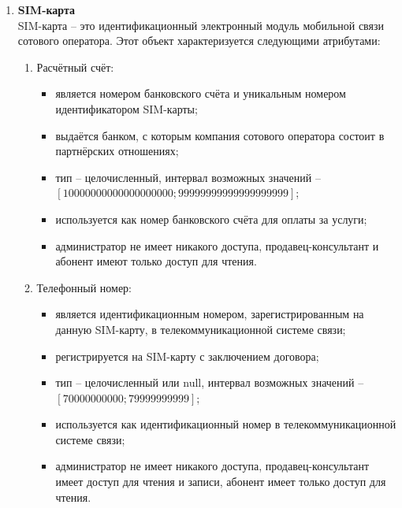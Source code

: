 \begin{enumerate}
    \item \textbf{SIM-карта} \\
    SIM-карта -- это идентификационный электронный модуль мобильной связи сотового оператора. Этот объект характеризуется следующими атрибутами:
    \begin{enumerate}
        \item Расчётный счёт:
        \begin{itemize}
            \item является номером банковского счёта и уникальным номером идентификатором SIM-карты;
            \item выдаётся банком, с которым компания сотового оператора состоит в партнёрских отношениях;
            \item тип -- целочисленный, интервал возможных значений -- $[10000000000000000000; 99999999999999999999]$;
            \item используется как номер банковского счёта для оплаты за услуги;
            \item администратор не имеет никакого доступа, продавец-консультант и абонент имеют только доступ для чтения.
        \end{itemize}

        \item Телефонный номер:
        \begin{itemize}
            \item является идентификационным номером, зарегистрированным на данную SIM-карту, в телекоммуникационной системе связи;
            \item регистрируется на SIM-карту с заключением договора;
            \item тип -- целочисленный или null, интервал возможных значений -- $[70000000000; 79999999999]$;
            \item используется как идентификационный номер в телекоммуникационной системе связи;
            \item администратор не имеет никакого доступа, продавец-консультант имеет доступ для чтения и записи, абонент имеет только доступ для чтения.
        \end{itemize}


\end{enumerate}
\end{enumerate}
